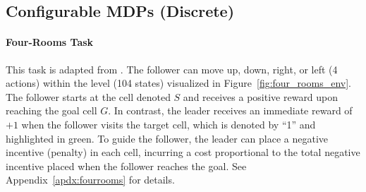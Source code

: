 \documentclass[letterpaper]{article} %
\begin{document}

\subsection{Configurable MDPs (Discrete)}\label{sec:experiment_CMDP_discrete}

\paragraph{Four-Rooms Task}
This task is adapted from \citet{Thoma2024-em}.
The follower can move up, down, right, or left (4 actions) within the level (104 states) visualized in Figure~\ref{fig:four_rooms_env}. The follower starts at the cell denoted $S$ and receives a positive reward upon reaching the goal cell $G$. 
In contrast, the leader receives an immediate reward of $+1$ when the follower visits the target cell, which is denoted by ``1'' and highlighted in green.
To guide the follower, the leader can place a negative incentive (penalty) in each cell, incurring a cost proportional to the total negative incentive placed when the follower reaches the goal. 
See Appendix~\ref{apdx:fourrooms} for details. 
\end{document}
